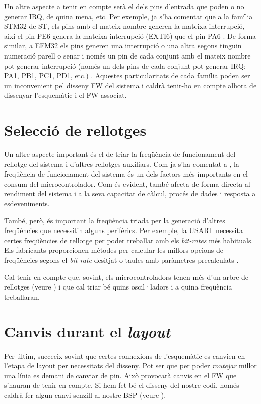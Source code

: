 Un altre aspecte a tenir en compte serà el dels pins d'entrada que poden o no generar \gls{IRQ}, de quina mena, etc. Per exemple, ja s'ha comentat que a la família STM32 de ST, els pins amb el mateix nombre generen la mateixa interrupció, així el pin PE6 genera la mateixa interrupció (EXTI6) que el pin PA6 \cite[382]{STM32F4RM}. De forma similar, a EFM32 els pins generen una interrupció o una altra segons tinguin numeració parell o senar i només un pin de cada conjunt amb el mateix nombre pot generar interrupció (només un dels pins de cada conjunt pot generar \gls{IRQ}: PA1, PB1, PC1, PD1, etc.) \cite[471]{EFM32TGRM}. Aquestes particularitats de cada família poden ser un inconvenient pel disseny \gls{FW} del sistema i caldrà tenir-ho en compte alhora de dissenyar l'esquemàtic i el \gls{FW} associat.

\section{Selecció de rellotges}
Un altre aspecte important és el de triar la freqüència de funcionament del rellotge del sistema i d'altres rellotges auxiliars. Com ja s'ha comentat a , la freqüència de funcionament del sistema és un dels factors més importants en el consum del microcontrolador. Com és evident, també afecta de forma directa al rendiment del sistema i a la seva capacitat de càlcul, procés de dades i resposta a esdeveniments.

També, però, és important la freqüència triada per la generació d'altres freqüències que necessitin alguns perifèrics. Per exemple, la USART necessita certes freqüències de rellotge per poder treballar amb els {\em bit-rates} més habituals. Els fabricants proporcionen mètodes per calcular les millors opcions de freqüències segons el {\em bit-rate} desitjat o taules amb paràmetres precalculats \cite[153]{EFM32TGRM} \cite[980]{STM32F4RM}.

Cal tenir en compte que, sovint, els microcontroladors tenen més d'un arbre de rellotges (veure ) i que cal triar bé quins oscil·ladors i a quina freqüència treballaran.

\section{Canvis durant el {\em layout}}
Per últim, succeeix sovint que certes connexions de l'esquemàtic es canvien en l'etapa de \gls{layout} per necessitats del disseny. Pot ser que per poder {\em routejar} millor una línia es demani de canviar de pin. Això provocarà canvis en el \gls{FW} que s'hauran de tenir en compte. Si hem fet bé el disseny del nostre codi, només caldrà fer algun canvi senzill al nostre \gls{BSP} (veure ).

